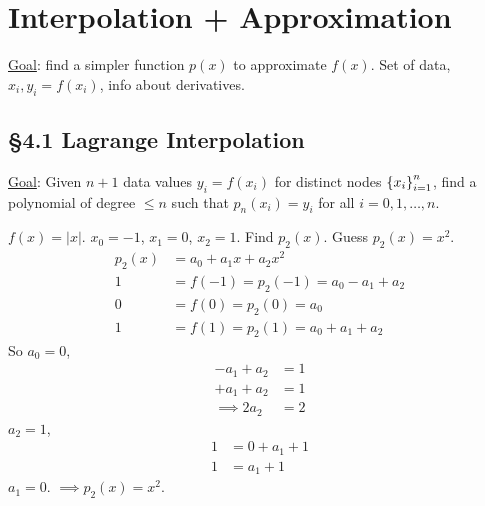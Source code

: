 \documentclass[]{article}
\begin{document}
\section*{Interpolation + Approximation}

\ul{Goal}: find a simpler function $p(x)$ to approximate $f(x)$.
Set of data, $x_i, y_i=f(x_i)$, info about derivatives.

\subsection*{\S4.1 Lagrange Interpolation}

\ul{Goal}: Given $n+1$ data values $y_i = f(x_i)$ for distinct nodes $\left\{ x_i \right\}_{i=1}^n$, find a polynomial of degree $\leq n$ such that $p_n(x_i)=y_i$ for all $i=0,1,\dots,n$.

\begin{example}
	$f(x) = |x|$. $x_0=-1$, $x_1=0$, $x_2=1$. Find $p_2(x)$.
	Guess $p_2(x) = x^2$.
	\begin{align*}
		p_2(x) &= a_0 + a_1x + a_2x^2 \\
		1 &= f(-1) = p_2(-1) = a_0 - a_1 + a_2 \\
		0 &= f(0) = p_2(0) = a_0 \\
		1 &= f(1) = p_2(1) = a_0 + a_1 + a_2
	\end{align*}
	So \ul{$a_0 = 0$},
	\begin{align*}
		- a_1 + a_2 &= 1 \\
		+ a_1 + a_2 &= 1 \\
		\implies 2a_2 &= 2
	\end{align*}
	\ul{$a_2=1$},
	\begin{align*}
		1 &= 0 + a_1 + 1 \\
		1 &= a_1 + 1
	\end{align*}
	\ul{$a_1 = 0$}.
	$\implies p_2(x) = x^2$.	
\end{example}
\end{document}
